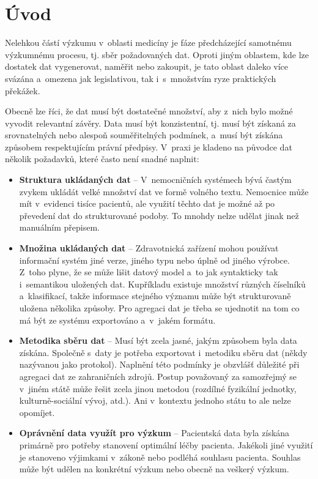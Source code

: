 \documentclass[11pt, draft, oneside]{fithesis2}
\newcommand{\polozka}[1]{\item {\bf #1}\xspace}
\begin{document}
\MainMatter

\tableofcontents

\chapter{Úvod}

Nelehkou částí výzkumu v~oblasti medicíny je fáze předcházející samotnému výzkumnému procesu, tj. sběr požadovaných dat. Oproti jiným oblastem, kde lze dostatek dat vygenerovat, naměřit nebo zakoupit, je tato oblast daleko více svázána a~omezena jak legislativou, tak i~s~množstvím ryze praktických překážek.

Obecně lze říci, že dat musí být dostatečné množství, aby z~nich bylo možné vyvodit relevantní závěry. Data musí být konzistentní, tj. musí být získaná za srovnatelných nebo alespoň souměřitelných podmínek, a~musí být získána způsobem respektujícím právní předpisy. V~praxi je kladeno na původce dat několik požadavků, které často není snadné naplnit:

\begin{itemize}
\polozka{Struktura ukládaných dat} -- V~nemocničních systémech bývá častým zvykem ukládát velké množství dat ve formě volného textu. Nemocnice může mít v~evidenci tisíce pacientů, ale využití těchto dat je možné až po převedení dat do strukturované podoby. To mnohdy nelze udělat jinak než manuálním přepisem.
	
	\polozka{Množina ukládaných dat} -- Zdravotnická zařízení mohou používat informační systém jiné verze, jiného typu nebo úplně od jiného výrobce. Z~toho plyne, že se může lišit datový model a~to jak syntakticky tak i~semantikou uložených dat. Kupříkladu existuje množství různých číselníků a~klasifikací, takže informace stejného významu může být strukturovaně uložena několika způsoby. Pro agregaci dat je třeba se ujednotit na tom co má být ze systému exportováno a~v~jakém formátu. 
		
	\polozka{Metodika sběru dat} -- Musí být zcela jasné, jakým způsobem byla data získána. Společně s~daty je potřeba exportovat i~metodiku sběru dat (někdy nazývanou jako protokol). Naplnění této podmínky je obzvlášť důležité při agregaci dat ze zahraničních zdrojů. Postup považovaný za samozřejmý se v~jiném státě může řešit zcela jinou metodou (rozdílné fyzikální jednotky, kulturně-sociální vývoj, atd.). Ani v~kontextu jednoho státu to ale nelze opomíjet. 
	
	\polozka{Oprávnění data využít pro výzkum} -- Pacientská data byla získána primárně pro potřeby stanovení optimální léčby pacienta. Jakékoli jiné využití je stanoveno výjimkami v~zákoně nebo podléhá souhlasu pacienta. Souhlas může být udělen na konkrétní výzkum nebo obecně na veškerý výzkum.
\end{itemize}
\end{document}
